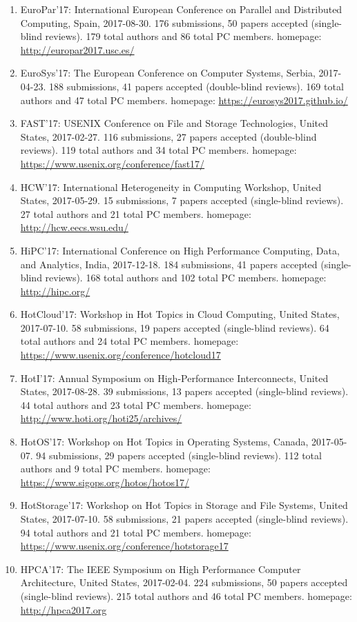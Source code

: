 \documentclass[10pt,letterpaper]{article}
\begin{document}
\begin{enumerate}
\item EuroPar'17: International European Conference on Parallel and Distributed Computing, Spain, 2017-08-30. 176  submissions, 50 papers accepted (single-blind reviews). 179 total authors and 86 total PC members. homepage: \url{http://europar2017.usc.es/}
\item EuroSys'17: The European Conference on Computer Systems, Serbia, 2017-04-23. 188  submissions, 41 papers accepted (double-blind reviews). 169 total authors and 47 total PC members. homepage: \url{https://eurosys2017.github.io/}
\item FAST'17: USENIX Conference on File and Storage Technologies, United States, 2017-02-27. 116  submissions, 27 papers accepted (double-blind reviews). 119 total authors and 34 total PC members. homepage: \url{https://www.usenix.org/conference/fast17/}
\item HCW'17: International Heterogeneity in Computing Workshop, United States, 2017-05-29. 15  submissions, 7 papers accepted (single-blind reviews). 27 total authors and 21 total PC members. homepage: \url{http://hcw.eecs.wsu.edu/}
\item HiPC'17: International Conference on High Performance Computing, Data, and Analytics, India, 2017-12-18. 184  submissions, 41 papers accepted (single-blind reviews). 168 total authors and 102 total PC members. homepage: \url{http://hipc.org/}
\item HotCloud'17: Workshop in Hot Topics in Cloud Computing, United States, 2017-07-10. 58  submissions, 19 papers accepted (single-blind reviews). 64 total authors and 24 total PC members. homepage: \url{https://www.usenix.org/conference/hotcloud17}
\item HotI'17: Annual Symposium on High-Performance Interconnects, United States, 2017-08-28. 39  submissions, 13 papers accepted (single-blind reviews). 44 total authors and 23 total PC members. homepage: \url{http://www.hoti.org/hoti25/archives/}
\item HotOS'17: Workshop on Hot Topics in Operating Systems, Canada, 2017-05-07. 94  submissions, 29 papers accepted (single-blind reviews). 112 total authors and 9 total PC members. homepage: \url{https://www.sigops.org/hotos/hotos17/}
\item HotStorage'17: Workshop on Hot Topics in Storage and File Systems, United States, 2017-07-10. 58  submissions, 21 papers accepted (single-blind reviews). 94 total authors and 21 total PC members. homepage: \url{https://www.usenix.org/conference/hotstorage17}
\item HPCA'17: The IEEE Symposium on High Performance Computer Architecture, United States, 2017-02-04. 224  submissions, 50 papers accepted (single-blind reviews). 215 total authors and 46 total PC members. homepage: \url{http://hpca2017.org}

\end{enumerate}
\end{document}
